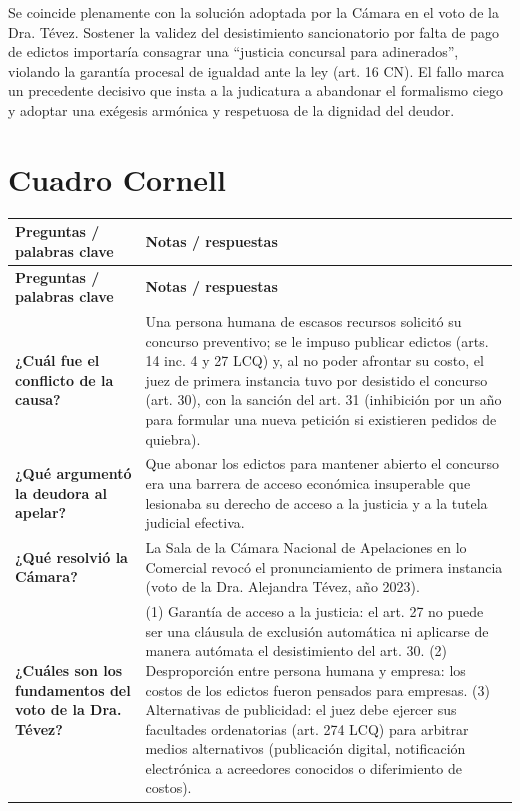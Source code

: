 \documentclass[12pt,oneside]{book}
\begin{document}
Se coincide plenamente con la solución adoptada por la Cámara en el voto de la Dra. Tévez. Sostener la validez del desistimiento sancionatorio por falta de pago de edictos importaría consagrar una ``justicia concursal para adinerados'', violando la garantía procesal de igualdad ante la ley (art. 16 CN). El fallo marca un precedente decisivo que insta a la judicatura a abandonar el formalismo ciego y adoptar una exégesis armónica y respetuosa de la dignidad del deudor.

\section{Cuadro Cornell}

\begin{longtable}{
    >{\raggedright\arraybackslash}p{}
    >{\raggedright\arraybackslash}p{}
}
\toprule
\textbf{Preguntas / palabras clave} & \textbf{Notas / respuestas} \\
\midrule
\endfirsthead
\toprule
\textbf{Preguntas / palabras clave} & \textbf{Notas / respuestas} \\
\midrule
\endhead
\bottomrule
\endfoot

\textbf{¿Cuál fue el conflicto de la causa?} &
Una persona humana de escasos recursos solicitó su concurso preventivo; se le impuso publicar edictos (arts. 14 inc. 4 y 27 LCQ) y, al no poder afrontar su costo, el juez de primera instancia tuvo por desistido el concurso (art. 30), con la sanción del art. 31 (inhibición por un año para formular una nueva petición si existieren pedidos de quiebra). \\[0.6em]

\textbf{¿Qué argumentó la deudora al apelar?} &
Que abonar los edictos para mantener abierto el concurso era una barrera de acceso económica insuperable que lesionaba su derecho de acceso a la justicia y a la tutela judicial efectiva. \\[0.6em]

\textbf{¿Qué resolvió la Cámara?} &
La Sala de la Cámara Nacional de Apelaciones en lo Comercial revocó el pronunciamiento de primera instancia (voto de la Dra. Alejandra Tévez, año 2023). \\[0.6em]

\textbf{¿Cuáles son los fundamentos del voto de la Dra. Tévez?} &
(1) Garantía de acceso a la justicia: el art. 27 no puede ser una cláusula de exclusión automática ni aplicarse de manera autómata el desistimiento del art. 30. (2) Desproporción entre persona humana y empresa: los costos de los edictos fueron pensados para empresas. (3) Alternativas de publicidad: el juez debe ejercer sus facultades ordenatorias (art. 274 LCQ) para arbitrar medios alternativos (publicación digital, notificación electrónica a acreedores conocidos o diferimiento de costos). \\[0.6em]


\end{longtable}
\end{document}
